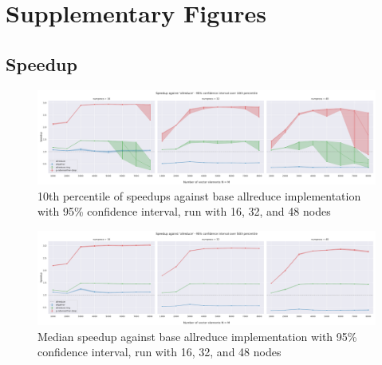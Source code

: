 \documentclass[letterpaper]{article}
\begin{document}


\onecolumn

\appendix

\section{Supplementary Figures}\label{app:figs}


\subsection{Speedup}

\begin{figure}[H]
    \centering
    \includegraphics[width=\columnwidth]{plots/speedup_plot_N_numprocs_16_32_48__baseline_allreduce_percentile_10_CI_0.95_with_errorbar.pdf}
    \caption{10th percentile of speedups against base allreduce implementation with 95\% confidence interval, run with 16, 32, and 48 nodes}
\end{figure}

\begin{figure}[H]
    \centering
    \includegraphics[width=\columnwidth]{plots/speedup_plot_N_numprocs_16_32_48__baseline_allreduce_percentile_50_CI_0.95_with_errorbar.pdf}
    \caption{Median speedup against base allreduce implementation with 95\% confidence interval, run with 16, 32, and 48 nodes}
\end{figure}
\end{document}
